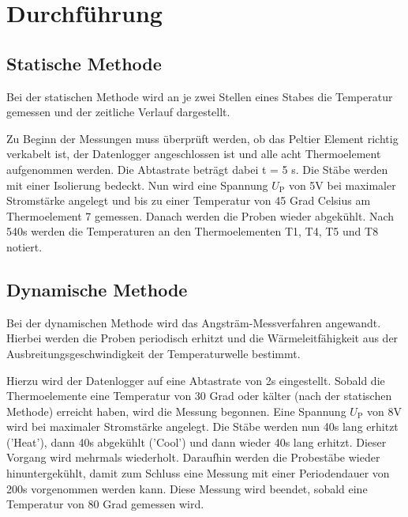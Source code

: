 \section{Durchführung}
\subsection{Statische Methode}
Bei der statischen Methode wird an je zwei Stellen eines Stabes die Temperatur gemessen und der zeitliche Verlauf dargestellt.

Zu Beginn der Messungen muss überprüft werden, ob das Peltier Element richtig verkabelt ist, der Datenlogger angeschlossen ist und alle acht Thermoelement aufgenommen werden. Die Abtastrate beträgt dabei t = 5 s. Die Stäbe werden mit einer Isolierung bedeckt. 
Nun wird eine Spannung $U_\text{P}$ von 5V bei maximaler Stromstärke angelegt und bis zu einer Temperatur von 45 Grad Celsius am Thermoelement 7 gemessen. Danach werden die Proben wieder abgekühlt. 
Nach 540s werden die Temperaturen an den Thermoelementen T1, T4, T5 und T8 notiert.

\subsection{Dynamische Methode}
Bei der dynamischen Methode wird das Angsträm-Messverfahren angewandt. Hierbei werden die Proben periodisch erhitzt und die Wärmeleitfähigkeit aus der Ausbreitungsgeschwindigkeit der Temperaturwelle bestimmt.

Hierzu wird der Datenlogger auf eine Abtastrate von 2s eingestellt. Sobald die Thermoelemente eine Temperatur von 30 Grad oder kälter (nach der statischen Methode) erreicht haben, wird die Messung begonnen. Eine Spannung $U_\text{P}$ von 8V wird bei maximaler Stromstärke angelegt. Die Stäbe werden nun 40s lang erhitzt ('Heat'), dann 40s abgekühlt ('Cool') und dann wieder 40s lang erhitzt. Dieser Vorgang wird mehrmals wiederholt. 
Daraufhin werden die Probestäbe wieder hinuntergekühlt, damit zum Schluss eine Messung mit einer Periodendauer von 200s vorgenommen werden kann. Diese Messung wird beendet, sobald eine Temperatur von 80 Grad gemessen wird. 